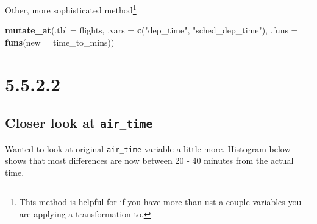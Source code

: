 \documentclass[]{book}
\newenvironment{Shaded}{\begin{snugshade}}{\end{snugshade}}
\newcommand{\DataTypeTok}[1]{\textcolor[rgb]{0.13,0.29,0.53}{#1}}
\newcommand{\DecValTok}[1]{\textcolor[rgb]{0.00,0.00,0.81}{#1}}
\newcommand{\KeywordTok}[1]{\textcolor[rgb]{0.13,0.29,0.53}{\textbf{#1}}}
\newcommand{\NormalTok}[1]{#1}
\newcommand{\OperatorTok}[1]{\textcolor[rgb]{0.81,0.36,0.00}{\textbf{#1}}}
\newcommand{\OtherTok}[1]{\textcolor[rgb]{0.56,0.35,0.01}{#1}}
\newcommand{\StringTok}[1]{\textcolor[rgb]{0.31,0.60,0.02}{#1}}
\let\rmarkdownfootnote\footnote%
\def\footnote{\protect\rmarkdownfootnote}
\theoremstyle{definition}
\theoremstyle{definition}
\theoremstyle{definition}
\theoremstyle{remark}
\begin{document}
Other, more sophisticated method\footnote{This method is helpful for if
  you have more than ust a couple variables you are applying a
  transformation to.}

\begin{Shaded}
\begin{Highlighting}[]
\KeywordTok{mutate_at}\NormalTok{(}\DataTypeTok{.tbl =}\NormalTok{ flights, }
          \DataTypeTok{.vars =} \KeywordTok{c}\NormalTok{(}\StringTok{"dep_time"}\NormalTok{, }\StringTok{"sched_dep_time"}\NormalTok{), }
          \DataTypeTok{.funs =} \KeywordTok{funs}\NormalTok{(}\DataTypeTok{new =}\NormalTok{ time_to_mins)) }
\end{Highlighting}
\end{Shaded}

\hypertarget{section-13}{%
\section{5.5.2.2}\label{section-13}}

\hypertarget{closer-look-at-air_time}{%
\subsection{\texorpdfstring{Closer look at
\texttt{air\_time}}{Closer look at air\_time}}\label{closer-look-at-air_time}}

Wanted to look at original \texttt{air\_time} variable a little more.
Histogram below shows that most differences are now between 20 - 40
minutes from the actual time.

\begin{Shaded}
\end{Shaded}
\end{document}
